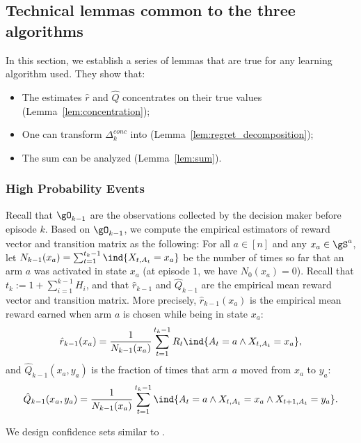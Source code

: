 \subsection{Technical lemmas common to the three algorithms}
\label{ssec:technical_lemmas}

In this section, we establish a series of lemmas that are true for any learning algorithm used. They show that:
\begin{itemize}
    \item The estimates $\hat{r}$ and $\hat{Q}$ concentrates on their true values (Lemma~\ref{lem:concentration});
    \item One can transform $\Delta^{conc}_k$ into  (Lemma~\ref{lem:regret_decomposition});
    \item The sum  can be analyzed (Lemma~\ref{lem:sum}).
\end{itemize}

\subsubsection{High Probability Events}

Recall that $\gO_{k-1}$ are the observations collected by the decision maker before episode $k$. Based on $\gO_{k-1}$, we compute the empirical estimators of reward vector and transition matrix as the following: For all $a\in[n]$ and any $x_a\in\gS^a$, let $N_{k-1}(x_a)=\sum_{t=1}^{t_{k}-1}\ind{X_{t,A_t}=x_a}$ be the number of times so far that an arm $a$ was activated in state $x_a$ (at episode $1$, we have ${N_0(x_a)=0}$).
Recall that $t_{k}{:=} 1 {+}\sum_{i=1}^{k-1}H_i$, and that $\hat{r}_{k-1}$ and $\hat{Q}_{k-1}$ are the empirical mean reward vector and transition matrix. More precisely, $\hat{r}_{k-1}(x_a)$ is the empirical mean reward earned when arm $a$ is chosen while being in state $x_a$:
\begin{align*}
    \hat{r}_{k-1}(x_a) = \frac{1}{N_{k-1}(x_a)}\sum_{t=1}^{t_{k}-1} R_t\ind{A_t=a \land X_{t,A_t}=x_a},
\end{align*}
and $\hat{Q}_{k-1}(x_a,y_a)$ is the fraction of times that arm $a$ moved from $x_a$ to $y_a$:
\begin{align*}
    \hat{Q}_{k-1}(x_a,y_a) = \frac{1}{N_{k-1}(x_a)}\sum_{t=1}^{t_{k}-1} \ind{A_t=a \land X_{t,A_t}=x_a \land X_{t+1,A_t}=y_a}.
\end{align*}

We design confidence sets similar to \cite{jaksch2010near,bartlett2012regal}.

